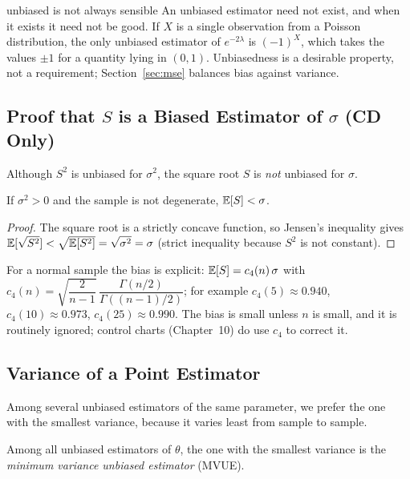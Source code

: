 \begin{nuance}{unbiased is not always sensible}
An unbiased estimator need not exist, and when it exists it need not be good. If $X$ is a single observation from a Poisson distribution, the only unbiased estimator of $e^{-2\lambda}$ is $(-1)^X$, which takes the values $\pm1$ for a quantity lying in $(0,1)$. Unbiasedness is a desirable property, not a requirement; Section~\ref{sec:mse} balances bias against variance.
\end{nuance}

\subsection{Proof that $S$ is a Biased Estimator of $\sigma$ (CD Only)}

Although $S^2$ is unbiased for $\sigma^2$, the square root $S$ is \emph{not} unbiased for $\sigma$.

\begin{theorem}\label{thm:sbiased}
If $\sigma^2>0$ and the sample is not degenerate, $\mathbb{E}[S]<\sigma$.
\end{theorem}

\begin{proof}
The square root is a strictly concave function, so Jensen's inequality gives $\mathbb{E}[\sqrt{S^2}]<\sqrt{\mathbb{E}[S^2]}=\sqrt{\sigma^2}=\sigma$ (strict inequality because $S^2$ is not constant).
\end{proof}

For a normal sample the bias is explicit: $\mathbb{E}[S]=c_4(n)\,\sigma$ with $c_4(n)=\sqrt{\dfrac2{n-1}}\,\dfrac{\Gamma(n/2)}{\Gamma((n-1)/2)}$; for example $c_4(5)\approx0.940$, $c_4(10)\approx0.973$, $c_4(25)\approx0.990$. The bias is small unless $n$ is small, and it is routinely ignored; control charts (Chapter~10) do use $c_4$ to correct it.

\subsection{Variance of a Point Estimator}

Among several unbiased estimators of the same parameter, we prefer the one with the smallest variance, because it varies least from sample to sample.

\begin{definition}[MVUE]
Among all unbiased estimators of $\theta$, the one with the smallest variance is the \emph{minimum variance unbiased estimator} (MVUE).
\end{definition}

